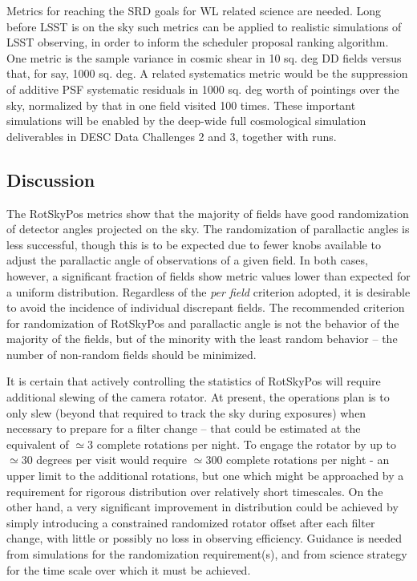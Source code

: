 
Metrics for reaching the SRD goals for WL related science are needed. Long
before LSST is on the sky such metrics can be applied to realistic simulations
of LSST observing, in order to inform the scheduler proposal ranking algorithm.
One metric is the sample variance in cosmic shear in 10 sq. deg DD fields versus
that, for say, 1000 sq. deg.  A related systematics metric would be the
suppression of additive PSF systematic residuals in 1000 sq. deg worth of
pointings over the sky, normalized by that in one field visited 100 times. These
important simulations will be enabled by the deep-wide full cosmological
simulation deliverables in DESC Data Challenges 2 and 3, together with \OpSim
runs.


\subsection{Discussion}

The RotSkyPos metrics show that the majority of fields have good randomization
of detector angles projected on the sky.  The randomization of parallactic
angles is less successful, though this is to be expected due to fewer knobs
available to adjust the parallactic angle of observations of a given field.  In
both cases, however, a significant fraction of fields show metric values lower
than expected for a uniform distribution.  Regardless of the \emph{per field}
criterion adopted, it is desirable to avoid the incidence of individual
discrepant fields.  The recommended criterion for randomization of RotSkyPos and
parallactic angle is not the behavior of the majority of the fields, but of the
minority with the least random behavior -- the number of non-random fields
should be minimized.

It is certain that actively controlling the statistics of RotSkyPos will require
additional slewing of the camera rotator.  At present, the operations plan is to
only slew (beyond that required to track the sky during exposures) when
necessary to prepare for a filter change -- that could be estimated at the
equivalent of $\simeq 3$ complete rotations per night.  To engage the rotator by
up to $\simeq 30$ degrees per visit would require $\simeq 300$ complete
rotations per night - an upper limit to the additional rotations, but one which might be approached by a requirement for
rigorous distribution over relatively short timescales.  On the other hand, a very significant improvement
in distribution could be achieved by simply introducing a constrained randomized rotator
offset after each filter change, with little or possibly no loss in observing efficiency.
Guidance is needed from simulations for the randomization requirement(s), and from science strategy
for the time scale over which it must be achieved.

